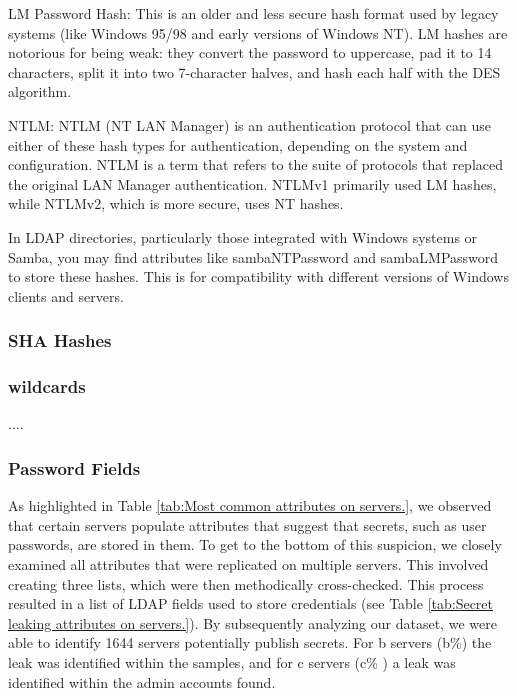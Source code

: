 LM Password Hash: This is an older and less secure hash format used by legacy systems (like Windows 95/98 and early versions of Windows NT). LM hashes are notorious for being weak: they convert the password to uppercase, pad it to 14 characters, split it into two 7-character halves, and hash each half with the DES algorithm.

NTLM: NTLM (NT LAN Manager) is an authentication protocol that can use either of these hash types for authentication, depending on the system and configuration. NTLM is a term that refers to the suite of protocols that replaced the original LAN Manager authentication. NTLMv1 primarily used LM hashes, while NTLMv2, which is more secure, uses NT hashes.

In LDAP directories, particularly those integrated with Windows systems or Samba, you may find attributes like sambaNTPassword and sambaLMPassword to store these hashes. This is for compatibility with different versions of Windows clients and servers.

\subsubsection{SHA Hashes}

\subsubsection{wildcards}

....

\subsubsection{Password Fields}

As highlighted in Table \ref{tab:Most common attributes on servers.}, we observed that certain servers populate attributes that suggest that secrets, such as user passwords, are stored in them. To get to the bottom of this suspicion, we closely examined all attributes that were replicated on multiple servers. This involved creating three lists, which were then methodically cross-checked. This process resulted in a list of LDAP fields used to store credentials (see Table \ref{tab:Secret leaking attributes on servers.}). By subsequently analyzing our dataset, we were able to identify 1644 servers potentially publish secrets. For b servers (b\%) the leak was identified within the samples, and for c servers (c\% ) a leak was identified within the admin accounts found.




